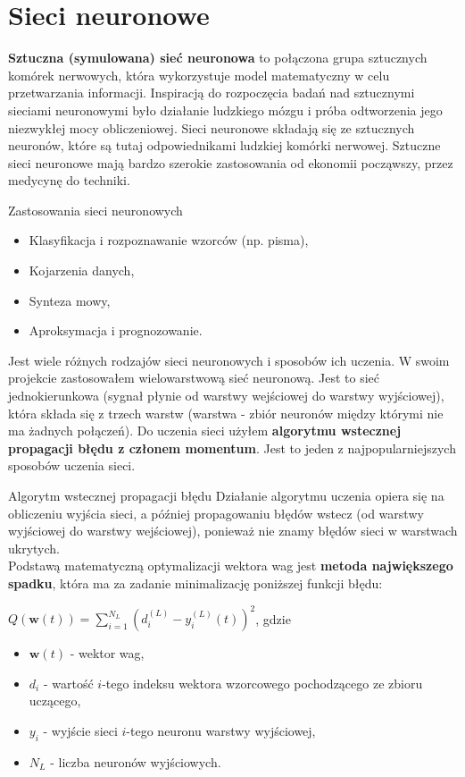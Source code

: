 \documentclass[a4paper,10pt]{beamer}
\begin{document}
		
		\section{Sieci neuronowe}
		
		\begin{frame}
			\textbf{Sztuczna (symulowana) sieć neuronowa} to połączona grupa sztucznych komórek nerwowych, która wykorzystuje model matematyczny w celu przetwarzania informacji. Inspiracją do rozpoczęcia badań nad sztucznymi sieciami neuronowymi było działanie ludzkiego mózgu i próba odtworzenia jego niezwykłej mocy obliczeniowej. Sieci neuronowe składają się ze sztucznych neuronów, które są tutaj odpowiednikami ludzkiej komórki nerwowej. Sztuczne sieci neuronowe mają bardzo szerokie zastosowania od ekonomii począwszy, przez medycynę do techniki.
		
		\end{frame}
		\begin{frame}{Zastosowania sieci neuronowych}
				\begin{itemize}
					\item{Klasyfikacja i rozpoznawanie wzorców (np. pisma),}
					\item{Kojarzenia danych,}
					\item{Synteza mowy,}
					\item{Aproksymacja i prognozowanie.}
				\end{itemize}
		\end{frame}
		\begin{frame}
			Jest wiele różnych rodzajów sieci neuronowych i sposobów ich uczenia. W swoim projekcie zastosowałem wielowarstwową sieć neuronową. Jest to sieć jednokierunkowa (sygnał płynie od warstwy wejściowej do warstwy wyjściowej), która składa się z trzech warstw (warstwa - zbiór neuronów między którymi nie ma żadnych połączeń). Do uczenia sieci użyłem \textbf{algorytmu wstecznej propagacji błędu z członem momentum}. Jest to jeden z najpopularniejszych sposobów uczenia sieci.
		\end{frame}
		\begin{frame}{Algorytm wstecznej propagacji błędu}
			Działanie algorytmu uczenia opiera się na obliczeniu wyjścia sieci, a później propagowaniu błędów wstecz (od warstwy wyjściowej do warstwy wejściowej), ponieważ nie znamy błędów sieci w warstwach ukrytych.\\
			 Podstawą matematyczną optymalizacji wektora wag jest \textbf{metoda największego spadku}, która ma za zadanie minimalizację poniższej funkcji błędu:
			\begin{center}
				$Q(\mathbf{w}(t))=\sum_{i=1}^{N_{L}}(d_{i}^{(L)}-y_{i}^{(L)}(t))^{2}$, gdzie
			\end{center}
			\begin{itemize}
				\item{$\mathbf{w}(t)$ - wektor wag,}
				\item{$d_i$ - wartość $i$-tego indeksu wektora wzorcowego pochodzącego ze zbioru uczącego,}
				\item{$y_i$ - wyjście sieci $i$-tego neuronu warstwy wyjściowej,}
				\item{$N_L$ - liczba neuronów wyjściowych.}
			\end{itemize}
		\end{frame}
\end{document}
